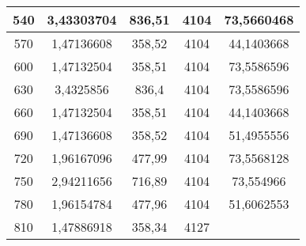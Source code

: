 \begin{longtable}[c]{ccccc}
    540   & 3,43303704 & 836,51 & 4104  & 73,5660468 \\
    \midrule
    570   & 1,47136608 & 358,52 & 4104  & 44,1403668 \\
    \midrule
    600   & 1,47132504 & 358,51 & 4104  & 73,5586596 \\
    \midrule
    630   & 3,4325856 & 836,4 & 4104  & 73,5586596 \\
    \midrule
    660   & 1,47132504 & 358,51 & 4104  & 44,1403668 \\
    \midrule
    690   & 1,47136608 & 358,52 & 4104  & 51,4955556 \\
    \midrule
    720   & 1,96167096 & 477,99 & 4104  & 73,5568128 \\
    \midrule
    750   & 2,94211656 & 716,89 & 4104  & 73,554966 \\
    \midrule
    780   & 1,96154784 & 477,96 & 4104  & 51,6062553 \\
    \midrule
    810   & 1,47886918 & 358,34 & 4127  &  \\
\end{longtable}
